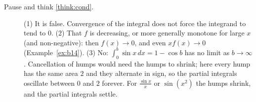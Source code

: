 \documentclass[11pt]{article}
\begin{document}
\begin{description}
  \item[Pause and think \ref{think:cond}.] (1) It is false. Convergence of the integral does not force the integrand to tend to $0$. (2) That $f$ is decreasing, or more generally monotone for large $x$ (and non-negative): then $f(x)\to0$, and even $xf(x)\to0$ (Example~\ref{ex:b14}). (3) No: $\int_0^b\sin x\,dx=1-\cos b$ has no limit as $b\to\infty$. Cancellation of humps would need the humps to shrink; here every hump has the same area $2$ and they alternate in sign, so the partial integrals oscillate between $0$ and $2$ forever. For $\frac{\sin x}x$ or $\sin\left(x^2\right)$ the humps shrink, and the partial integrals settle.
\end{description}
\end{document}
